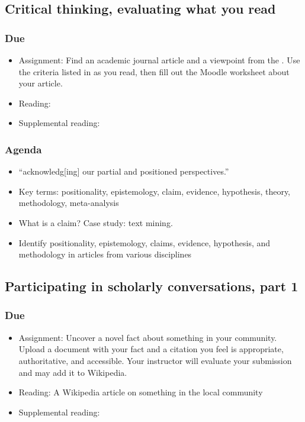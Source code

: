 \documentclass[12pt,article,oneside]{memoir}
\begin{document}
\subsection{Critical thinking, evaluating what you read}
\subsubsection{Due}
\begin{itemize}
 \item Assignment: Find an academic journal article and a viewpoint from the .  Use the criteria listed in \cite{evaluation} as you read, then fill out the Moodle worksheet about your article.
 \item Reading: \cite{evaluation}
 \item Supplemental reading: \cite{religion}
\end{itemize}

\subsubsection{Agenda}
\begin{itemize}
\item ``acknowledg[ing] our partial and positioned perspectives.'' \cite{finn2003just}
\item Key terms: positionality, epistemology, claim, evidence, hypothesis, theory, methodology, meta-analysis
\item What is a claim?  Case study: text mining.
\item Identify positionality, epistemology, claims, evidence, hypothesis, and methodology in articles from various disciplines
\end{itemize}

\subsection{Participating in scholarly conversations, part 1}
\subsubsection{Due}
\begin{itemize}
 \item Assignment: Uncover a novel fact about something in your community.  Upload a document with your fact and a citation you feel is appropriate, authoritative, and accessible.  Your instructor will evaluate your submission and may add it to Wikipedia.
 \item Reading: A Wikipedia article on something in the local community
 \item Supplemental reading: \cite{doyle}
\end{itemize}
\end{document}
